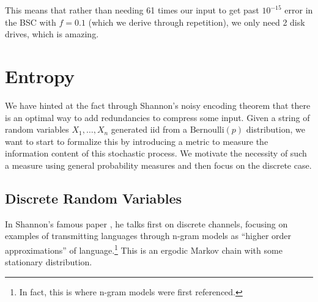 \documentclass{article}
\begin{document}
    This means that rather than needing 61 times our input to get past $10^{-15}$ error in the BSC with $f = 0.1$ (which we derive through repetition), we only need 2 disk drives, which is amazing. 

\section{Entropy}

  We have hinted at the fact through Shannon's noisy encoding theorem that there is an optimal way to add redundancies to compress some input. Given a string of random variables $X_1, \ldots, X_n$ generated iid from a $\mathrm{Bernoulli}(p)$ distribution, we want to start to formalize this by introducing a metric to measure the information content of this stochastic process. We motivate the necessity of such a measure using general probability measures and then focus on the discrete case. 

  \subsection{Discrete Random Variables}

    In Shannon's famous paper \cite{shannon}, he talks first on discrete channels, focusing on examples of transmitting languages through n-gram models as ``higher order approximations'' of language.\footnote{In fact, this is where n-gram models were first referenced.} This is an ergodic Markov chain with some stationary distribution. 
\end{document}
